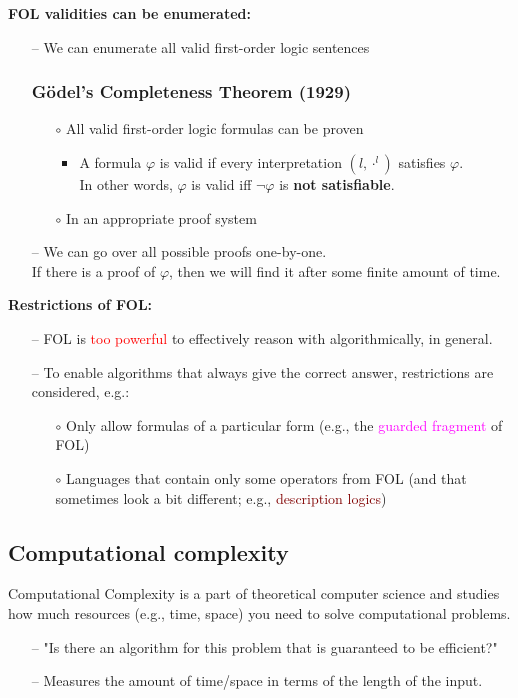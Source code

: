 \textbf{FOL validities can be enumerated:}
\begin{itemize}
    \item[--] We can \textcolor{PineGreen}{enumerate} all valid first-order logic sentences
    \subsubsection{Gödel's Completeness Theorem (1929)}
    \begin{itemize}
        \item[$\circ$] All valid first-order logic formulas can be proven
        \begin{itemize}
            \item A formula $\varphi$ is \textcolor{PineGreen}{valid} if every interpretation $(l, \cdot^l)$ satisfies $\varphi$. \\
            In other words, $\varphi$ is \textcolor{PineGreen}{valid} iff $\neg \varphi$ is \textbf{not satisfiable}.
        \end{itemize}
        \item[$\circ$] In an appropriate proof system
    \end{itemize}
    \item[--] We can go over all possible proofs one-by-one. \\
    If there is a proof of $\varphi$, then we will find it after some finite amount of time.
\end{itemize}

\textbf{Restrictions of FOL:} \\
\begin{itemize}
    \item[--] FOL is \textcolor{red}{too powerful} to effectively reason with algorithmically, in general.
    \item[--] To enable algorithms that always give the correct answer, restrictions are considered, e.g.:
    \begin{itemize}
        \item[$\circ$] Only allow formulas of a particular form (e.g., the \textcolor{Magenta}{guarded fragment} of FOL)
        \item[$\circ$] Languages that contain only some operators from FOL (and that sometimes look a bit different; e.g., \textcolor{Maroon}{description logics})
    \end{itemize}
\end{itemize}

\subsection{Computational complexity}
Computational Complexity is a part of theoretical computer science and studies how much resources (e.g., time, space) you need to solve computational problems.
\begin{itemize}
    \item[--] "Is there an algorithm for this problem that is guaranteed to be efficient?"
    \item[--] Measures the amount of time/space in terms of the length of the input.
\end{itemize}

